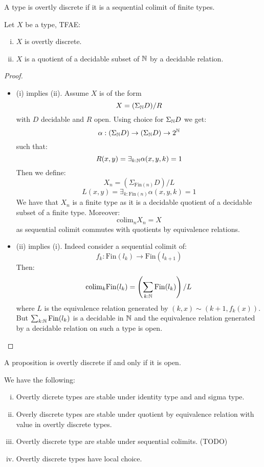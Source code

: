 \begin{definition}
A type is overtly discrete if it is a sequential colimit of finite types.
\end{definition}

\begin{lemma}\label{overtly-discrete-colimit-finite}
Let $X$ be a type, TFAE:
\begin{enumerate}[(i)]
\item $X$ is overtly discrete.
\item $X$ is a quotient of a decidable subset of $\mathbb{N}$ by a decidable relation.
\end{enumerate}
\end{lemma}

\begin{proof}
\begin{itemize}
\item (i) implies (ii). Assume $X$ is of the form
\[X  = (\Sigma_{\mathbb{N}} D)/R\]
with $D$ decidable and $R$ open. Using choice for $\Sigma_{\mathbb{N}} D$ we get:
\[\alpha : (\Sigma_{\mathbb{N}} D) \to (\Sigma_{\mathbb{N}} D)\to 2^{\mathbb{N}}\]
such that:
\[R(x,y) = \exists_{k:\mathbb{N}} \alpha(x,y,k) = 1\]
Then we define:
\[X_n = (\Sigma_{\mathrm{Fin}(n)} D) / L\]
\[L(x,y) = \exists_{k:\mathrm{Fin}(n)} \alpha(x,y,k) = 1\]
We have that $X_n$ is a finite type as it is a decidable quotient of a decidable subset of a finite type. Moreover:
\[\mathrm{colim}_n X_n = X\]
as sequential colimit commutes with quotients by equivalence relations.
\item (ii) implies (i). Indeed consider a sequential colimit of:
\[f_k : \mathrm{Fin}(l_k) \to \mathrm{Fin}(l_{k+1})\]
Then:
\[\mathrm{colim}_k \mathrm{Fin}(l_k)  =  \left(\sum_{k:\mathbb{N}} \mathrm{Fin}(l_k)\right) / L\]
where $L$ is the equivalence relation generated by $(k,x) \sim (k+1,f_k(x))$. But $\sum_{k:\mathbb{N}} \mathrm{Fin}(l_k)$ is a decidable in $\mathbb{N}$ and the equivalence relation generated by a decidable relation on such a type is open.
\end{itemize}
\end{proof}

\begin{remark}
A proposition is overtly discrete if and only if it is open.
\end{remark}

\begin{theorem}
We have the following:
\begin{enumerate}[(i)]
\item Overtly dicrete types are stable under identity type and and sigma type.
\item Overly discrete types are stable under quotient by equivalence relation with value in overtly discrete types.
\item Overtly discrete type are stable under sequential colimits. (TODO)
\item Overtly discrete types have local choice.
\end{enumerate}
\end{theorem}

